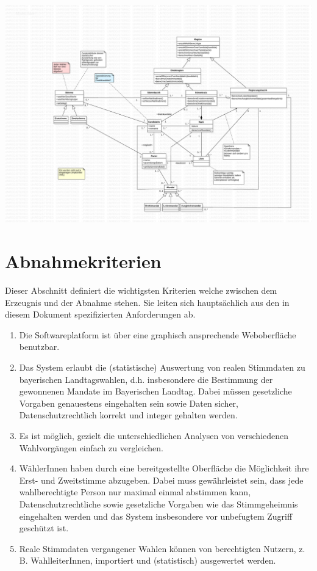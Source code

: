 \documentclass[a4paper,12pt]{article}
\begin{document}
\begin{center}
	\includegraphics[width=\textwidth]{../model.pdf}
\end{center}

\section{Abnahmekriterien}
Dieser Abschnitt definiert die wichtigsten Kriterien welche zwischen dem Erzeugnis und der Abnahme stehen.
Sie leiten sich hauptsächlich aus den in diesem Dokument spezifizierten Anforderungen ab.

\begin{enumerate}
  \item Die Softwareplatform ist über eine graphisch ansprechende Weboberfläche benutzbar.
  \item Das System erlaubt die (statistische) Auswertung von realen Stimmdaten zu bayerischen Landtagswahlen, d.h. 
        insbesondere die Bestimmung der gewonnenen Mandate im Bayerischen Landtag. Dabei müssen gesetzliche
        Vorgaben genauestens eingehalten sein sowie Daten sicher, Datenschutzrechtlich korrekt und integer gehalten
        werden.
  \item Es ist möglich, gezielt die unterschiedlichen Analysen von verschiedenen Wahlvorgängen einfach zu vergleichen.
  \item WählerInnen haben durch eine bereitgestellte Oberfläche die Möglichkeit ihre Erst- und Zweitstimme abzugeben.
        Dabei muss gewährleistet sein, dass jede wahlberechtigte Person nur maximal einmal abstimmen kann, 
        Datenschutzrechtliche sowie gesetzliche Vorgaben wie das Stimmgeheimnis eingehalten werden und das System 
        insbesondere vor unbefugtem Zugriff geschützt ist.
  \item Reale Stimmdaten vergangener Wahlen können von berechtigten Nutzern, z. B. WahlleiterInnen, importiert und
        (statistisch) ausgewertet werden.
\end{enumerate}
\end{document}
